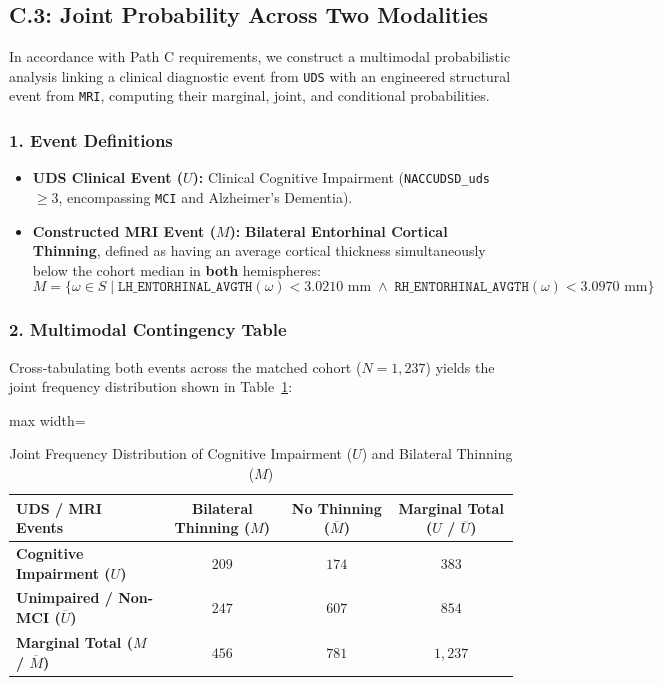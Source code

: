 \documentclass[11pt, a4paper]{article}
\begin{document}
\subsection{C.3: Joint Probability Across Two Modalities}
In accordance with Path C requirements, we construct a multimodal probabilistic analysis linking a clinical diagnostic event from \texttt{UDS} with an engineered structural event from \texttt{MRI}, computing their marginal, joint, and conditional probabilities.

\subsubsection*{1. Event Definitions}
\begin{itemize}
    \item \textbf{UDS Clinical Event ($U$):} Clinical Cognitive Impairment (\texttt{NACCUDSD\_uds} $\ge 3$, encompassing \texttt{MCI} and Alzheimer's Dementia).
    \item \textbf{Constructed MRI Event ($M$):} \textbf{Bilateral Entorhinal Cortical Thinning}, defined as having an average cortical thickness simultaneously below the cohort median in \textbf{both} hemispheres:
    \[
    M = \{ \omega \in S \mid \texttt{LH\_ENTORHINAL\_AVGTH}(\omega) < 3.0210\text{ mm} \;\land\; \texttt{RH\_ENTORHINAL\_AVGTH}(\omega) < 3.0970\text{ mm} \}
    \]
\end{itemize}

\subsubsection*{2. Multimodal Contingency Table}
Cross-tabulating both events across the matched cohort ($N = 1,237$) yields the joint frequency distribution shown in Table~\ref{tab:pathc_c3}:

\begin{table}[H]
\centering
\caption{Joint Frequency Distribution of Cognitive Impairment ($U$) and Bilateral Thinning ($M$)}
\label{tab:pathc_c3}
\begin{adjustbox}{max width=\textwidth}
\small
\setlength{\tabcolsep}{5pt}
\begin{tabular}{lccc}
\toprule
\textbf{UDS / MRI Events} & \textbf{Bilateral Thinning ($M$)} & \textbf{No Thinning ($\overline{M}$)} & \textbf{Marginal Total ($U$ / $\overline{U}$)} \\
\midrule
\textbf{Cognitive Impairment ($U$)} & $209$ & $174$ & \textbf{$383$} \\
\textbf{Unimpaired / Non-MCI ($\overline{U}$)} & $247$ & $607$ & \textbf{$854$} \\
\midrule
\textbf{Marginal Total ($M$ / $\overline{M}$)} & \textbf{$456$} & \textbf{$781$} & \textbf{$1,237$} \\
\bottomrule
\end{tabular}
\end{adjustbox}
\end{table}
\end{document}
